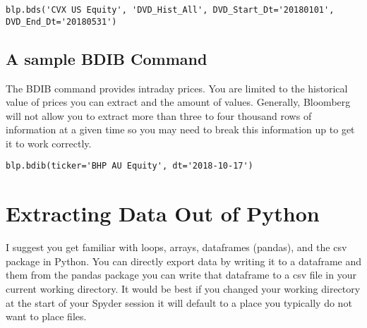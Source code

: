 \documentclass[]{book}
\begin{document}
\begin{verbatim}
blp.bds('CVX US Equity', 'DVD_Hist_All', DVD_Start_Dt='20180101', DVD_End_Dt='20180531')
\end{verbatim}

\subsection{A sample BDIB Command}\label{a-sample-bdib-command}

The BDIB command provides intraday prices. You are limited to the
historical value of prices you can extract and the amount of values.
Generally, Bloomberg will not allow you to extract more than three to
four thousand rows of information at a given time so you may need to
break this information up to get it to work correctly.

\begin{verbatim}
blp.bdib(ticker='BHP AU Equity', dt='2018-10-17')
\end{verbatim}

\section{Extracting Data Out of
Python}\label{extracting-data-out-of-python}

I suggest you get familiar with loops, arrays, dataframes (pandas), and
the csv package in Python. You can directly export data by writing it to
a dataframe and them from the pandas package you can write that
dataframe to a csv file in your current working directory. It would be
best if you changed your working directory at the start of your Spyder
session it will default to a place you typically do not want to place
files.


\end{document}
